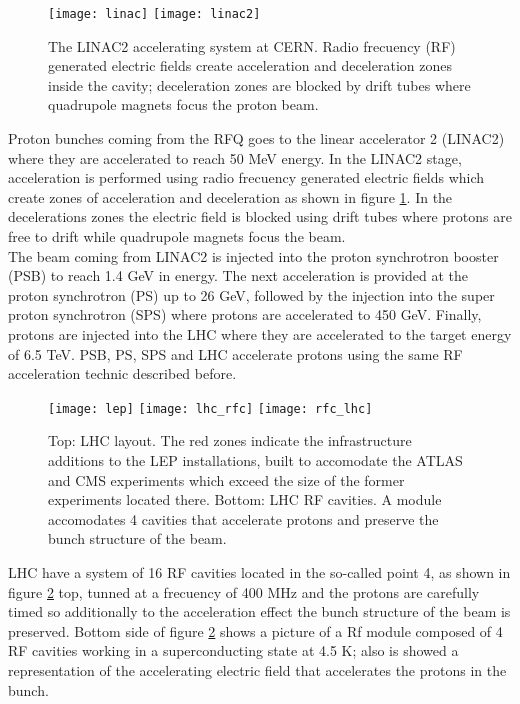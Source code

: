\begin{figure}[!h]
  \centering
  \texttt{[image: linac]}
  \texttt{[image: linac2]}
  \caption [The LINAC2 accelerating system at CERN.]{The LINAC2 accelerating system at CERN. Radio frecuency (RF) generated electric fields create acceleration and deceleration zones inside the cavity; deceleration zones are blocked by drift tubes where quadrupole magnets focus the proton beam.\cite{linac}}\label{fig:linac}
\end{figure}

\noindent Proton bunches coming from the RFQ goes to the linear accelerator 2 (LINAC2) where they are accelerated to reach 50 MeV energy. In the LINAC2 stage, acceleration is performed using radio frecuency generated electric fields which create zones of acceleration and deceleration as shown in figure \ref{fig:linac}. In the decelerations zones the electric field is blocked using drift tubes where protons are free to drift while quadrupole magnets focus the beam.\\   

\noindent The beam coming from LINAC2 is injected into the proton synchrotron booster (PSB) to reach 1.4 GeV in energy. The next acceleration is provided at the proton synchrotron (PS) up to 26 GeV, followed by the injection into the super proton synchrotron (SPS) where protons are accelerated to 450 GeV. Finally, protons are injected into the LHC where they are accelerated to the target energy of 6.5 TeV.
\noindent PSB, PS, SPS and LHC accelerate protons using the same RF acceleration technic described before. 

\begin{figure}[!h]
\centering
\texttt{[image: lep]}
\texttt{[image: lhc\_rfc]}
\texttt{[image: rfc\_lhc]}
\caption[LHC layout and RF cavities module.]{Top: LHC layout. The red zones indicate the infrastructure additions to the LEP installations, built to accomodate the ATLAS and CMS experiments which exceed the size of the former experiments located there\cite{lep}. Bottom: LHC RF cavities. A module accomodates 4 cavities that accelerate protons and preserve the bunch structure of the beam.\cite{video,lhc_rfc}}\label{fig:lep_rfc}
\end{figure}

\noindent LHC have a system of 16 RF cavities located in the so-called point 4, as shown in figure \ref{fig:lep_rfc} top, tunned at a frecuency of 400 MHz and the protons are carefully timed so additionally to the acceleration effect the bunch structure of the beam is preserved. Bottom side of figure \ref{fig:lep_rfc} shows a picture of a Rf module composed of 4 RF cavities working in a superconducting state at 4.5 K; also is showed a representation of the accelerating electric field that accelerates the protons in the bunch.\\ 

